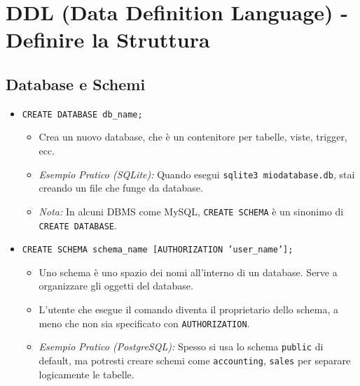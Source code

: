 	\section{DDL (Data Definition Language) - Definire la Struttura}
	
	\subsection{Database e Schemi}
	\begin{itemize}
		\item \texttt{CREATE DATABASE db\_name;}
		\begin{itemize}
			\item Crea un nuovo database, che è un contenitore per tabelle, viste, trigger, ecc.
			\item \textit{Esempio Pratico (SQLite):} Quando esegui \texttt{sqlite3 miodatabase.db}, stai creando un file che funge da database.
			\item \textit{Nota:} In alcuni DBMS come MySQL, \texttt{CREATE SCHEMA} è un sinonimo di \texttt{CREATE DATABASE}.
		\end{itemize}
		\item \texttt{CREATE SCHEMA schema\_name [AUTHORIZATION 'user\_name'];}
		\begin{itemize}
			\item Uno schema è uno spazio dei nomi all'interno di un database. Serve a organizzare gli oggetti del database.
			\item L'utente che esegue il comando diventa il proprietario dello schema, a meno che non sia specificato con \texttt{AUTHORIZATION}.
			\item \textit{Esempio Pratico (PostgreSQL):} Spesso si usa lo schema \texttt{public} di default, ma potresti creare schemi come \texttt{accounting}, \texttt{sales} per separare logicamente le tabelle.
		\end{itemize}
	\end{itemize}
	
